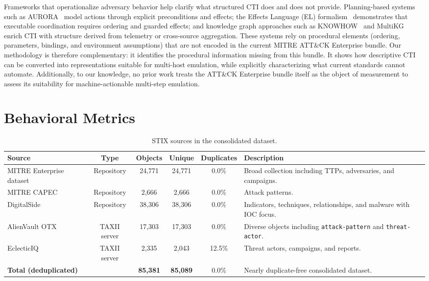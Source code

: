\documentclass[sigconf]{acmart}
\newcommand{\stix}{STIX\xspace}
\newcommand{\mitre}{MITRE\xspace}
\newcommand{\attack}{ATT\&CK\xspace}
\begin{document}
Frameworks that operationalize adversary behavior help clarify what structured CTI does and does not provide. Planning-based systems such as AURORA~\cite{wang2024sands} model actions through explicit preconditions and effects; the Effects Language (EL) formalism~\cite{damodaran2025automated} demonstrates that executable coordination requires ordering and guarded effects; and knowledge graph approaches such as KNOWHOW~\cite{meng2025knowhow} and MultiKG~\cite{wang2024multikg} enrich CTI with structure derived from telemetry or cross-source aggregation. These systems rely on procedural elements (ordering, parameters, bindings, and environment assumptions) that are not encoded in the current \mitre{} \attack{} Enterprise bundle. Our methodology is therefore complementary: it identifies the procedural information missing from this bundle. It shows how descriptive CTI can be converted into representations suitable for multi-host emulation, while explicitly characterizing what current standards cannot automate. Additionally, to our knowledge, no prior work treats the \attack{} Enterprise bundle itself as the object of measurement to assess its suitability for machine-actionable multi-step emulation.

\section{Behavioral Metrics}
\label{sec:definitions}

\begin{table}[!t]
  \caption{\stix{} sources in the consolidated dataset.}
  \label{tab:sources}
  \centering
  \small
  \begin{tabular}{@{}lccccl@{}}
    \toprule
    Source & Type & Objects & Unique & Duplicates & Description \\
    \midrule
    \mitre{} Enterprise dataset & Repository & 24,771 & 24,771 & 0.0\% & Broad collection including TTPs, adversaries, and campaigns. \\
    \mitre{} CAPEC & Repository & 2,666 & 2,666 & 0.0\% & Attack patterns. \\
    DigitalSide & Repository & 38,306 & 38,306 & 0.0\% & Indicators, techniques, relationships, and malware with IOC focus. \\
    AlienVault OTX & TAXII server & 17,303 & 17,303 & 0.0\% & Diverse objects including \texttt{attack-pattern} and \texttt{threat-actor}. \\
    EclecticIQ & TAXII server & 2,335 & 2,043 & 12.5\% & Threat actors, campaigns, and reports. \\
    \midrule
    \textbf{Total (deduplicated)} & & \textbf{85,381} & \textbf{85,089} & 0.0\% & Nearly duplicate-free consolidated dataset. \\
    \bottomrule
  \end{tabular}
\end{table}
\end{document}

